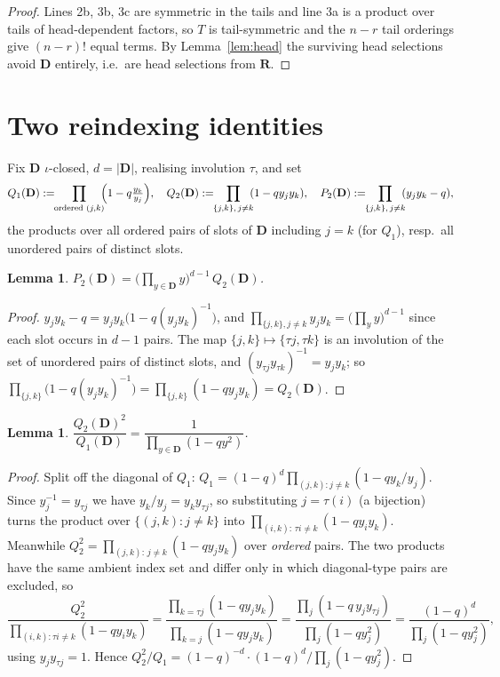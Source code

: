 \documentclass[11pt]{article}
\newtheorem{lem}[thm]{Lemma}
\theoremstyle{definition}
\newcommand{\bD}{\mathbf{D}}
\newcommand{\bR}{\mathbf{R}}
\begin{document}
\begin{proof}
Lines 2b, 3b, 3c are symmetric in the tails and line 3a is a product over tails
of head-dependent factors, so $T$ is tail-symmetric and the $n-r$ tail orderings
give $(n-r)!$ equal terms.  By Lemma~\ref{lem:head} the surviving head selections
avoid $\bD$ entirely, i.e.\ are head selections from $\bR$.
\end{proof}

\section{Two reindexing identities}
\label{sec:ident}

Fix $\bD$ $\iota$-closed, $d=|\bD|$, realising involution $\tau$, and set
\[
  Q_1(\bD):=\!\!\prod_{\text{ordered }(j,k)}\!\!\Bigl(1-q\tfrac{y_k}{y_j}\Bigr),\quad
  Q_2(\bD):=\!\!\prod_{\{j,k\},\,j\ne k}\!\!(1-qy_jy_k),\quad
  P_2(\bD):=\!\!\prod_{\{j,k\},\,j\ne k}\!\!(y_jy_k-q),
\]
the products over all ordered pairs of slots of $\bD$ including $j=k$ (for $Q_1$),
resp.\ all unordered pairs of distinct slots.

\begin{lem}\label{lem:I1}
$P_2(\bD)=\bigl(\prod_{y\in\bD}y\bigr)^{d-1}\,Q_2(\bD)$.
\end{lem}

\begin{proof}
$y_jy_k-q=y_jy_k\bigl(1-q(y_jy_k)^{-1}\bigr)$, and
$\prod_{\{j,k\},j\ne k}y_jy_k=\bigl(\prod_y y\bigr)^{d-1}$ since each slot occurs
in $d-1$ pairs.  The map $\{j,k\}\mapsto\{\tau j,\tau k\}$ is an involution of the
set of unordered pairs of distinct slots, and
$(y_{\tau j}y_{\tau k})^{-1}=y_jy_k$; so
$\prod_{\{j,k\}}\bigl(1-q(y_jy_k)^{-1}\bigr)=\prod_{\{j,k\}}(1-qy_jy_k)=Q_2(\bD)$.
\end{proof}

\begin{lem}\label{lem:I2}
$\dfrac{Q_2(\bD)^{2}}{Q_1(\bD)}=\dfrac{1}{\prod_{y\in\bD}(1-qy^{2})}$.
\end{lem}

\begin{proof}
Split off the diagonal of $Q_1$: $Q_1=(1-q)^{d}\prod_{(j,k):j\ne k}(1-qy_k/y_j)$.
Since $y_j^{-1}=y_{\tau j}$ we have $y_k/y_j=y_ky_{\tau j}$, so substituting
$j=\tau(i)$ (a bijection) turns the product over $\{(j,k):j\ne k\}$ into
$\prod_{(i,k):\,\tau i\ne k}(1-qy_iy_k)$.  Meanwhile
$Q_2^{2}=\prod_{(j,k):\,j\ne k}(1-qy_jy_k)$ over \emph{ordered} pairs.  The two
products have the same ambient index set and differ only in which diagonal-type
pairs are excluded, so
\[
  \frac{Q_2^{2}}{\prod_{(i,k):\tau i\ne k}(1-qy_iy_k)}
  =\frac{\prod_{k=\tau j}(1-qy_jy_k)}{\prod_{k=j}(1-qy_jy_k)}
  =\frac{\prod_{j}(1-q\,y_jy_{\tau j})}{\prod_j(1-qy_j^{2})}
  =\frac{(1-q)^{d}}{\prod_j(1-qy_j^{2})},
\]
using $y_jy_{\tau j}=1$.  Hence
$Q_2^{2}/Q_1=(1-q)^{-d}\cdot(1-q)^{d}/\prod_j(1-qy_j^2)$.
\end{proof}
\end{document}
